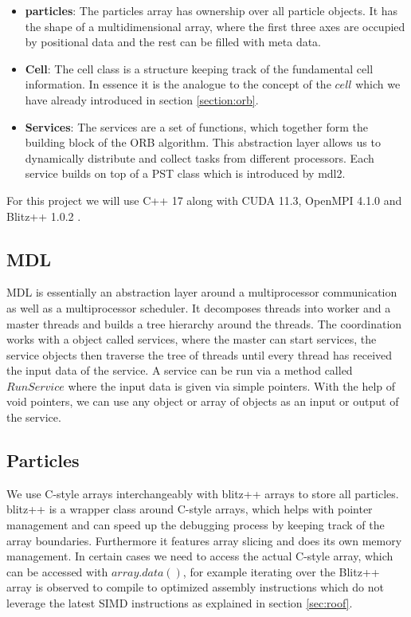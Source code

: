 \documentclass[]{article}
\begin{document}
\begin{itemize}
	\item \textbf{particles}: The particles array has ownership over all particle objects. It has the shape of a multidimensional array, where the first three axes are occupied by positional data and the rest can be filled with meta data.
	\item \textbf{Cell}: The cell class is a structure keeping track of the fundamental cell information. In essence it is the analogue to the concept of the $cell$ which we have already introduced in section \ref{section:orb}.
	\item \textbf{Services}: The services are a set of functions, which together form the building block of the ORB algorithm. This abstraction layer allows us to dynamically distribute and collect tasks from different processors. Each service builds on top of a PST class which is introduced by mdl2.
	
\end{itemize}

For this project we will use C++ 17 along with CUDA 11.3, OpenMPI 4.1.0 and Blitz++ 1.0.2 \cite{blitzcpp}. 

\subsection{MDL}

MDL is essentially an abstraction layer around a multiprocessor communication as well as a multiprocessor scheduler. It decomposes threads into worker and a master threads and builds a tree hierarchy around the threads. The coordination works with a object called services, where the master can start services, the service objects then traverse the tree of threads until every thread has received the input data of the service. A service can be run via a method called $RunService$ where the input data is given via simple pointers. With the help of void pointers, we can use any object or array of objects as an input or output of the service. 

\subsection{Particles}

We use C-style arrays interchangeably with blitz++ arrays to store all particles. blitz++ is a wrapper class around C-style arrays, which helps with pointer management and can speed up the debugging process by keeping track of the array boundaries. Furthermore it features array slicing and does its own memory management. In certain cases we need to access the actual C-style array, which can be accessed with $array.data()$, for example iterating over the Blitz++ array is observed to compile to optimized assembly instructions which do not leverage the latest SIMD instructions as explained in section \ref{sec:roof}.
\end{document}
